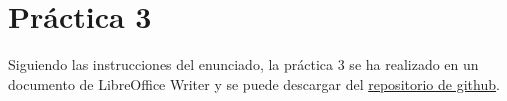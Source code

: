 \part{Práctica 3}
Siguiendo las instrucciones del enunciado, la práctica 3 se ha realizado en un documento de LibreOffice Writer y se puede descargar del \href{https://github.com/eduarroyo/slcs-practicas/blob/master/Practica3/SLYCSPractica3.odt}{repositorio de github}.